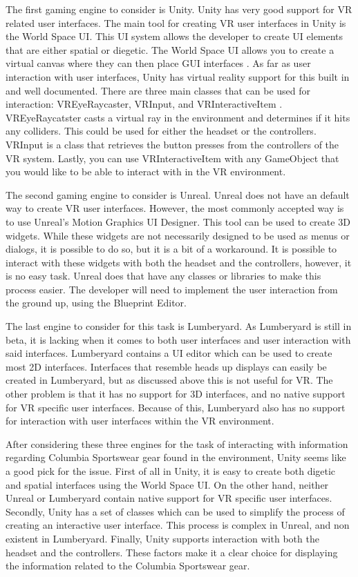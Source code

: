 \documentclass[10pt,journal,compsoc,onecolumn, draftclsnofoot]{IEEEtran}
\begin{document}
\begin{bibunit}
The first gaming engine to consider is Unity.
Unity has very good support for VR related user interfaces.
The main tool for creating VR user interfaces in Unity is the World Space UI.
This UI system allows the developer to create UI elements that are either spatial or diegetic.
The World Space UI allows you to create a virtual canvas where they can then place GUI interfaces \cite{unity_world_space}.
As far as user interaction with user interfaces, Unity has virtual reality support for this built in and well documented.
There are three main classes that can be used for interaction: VREyeRaycaster, VRInput, and VRInteractiveItem \cite{unity_interface_interaction}.
VREyeRaycatster casts a virtual ray in the environment and determines if it hits any colliders.
This could be used for either the headset or the controllers.
VRInput is a class that retrieves the button presses from the controllers of the VR system.
Lastly, you can use VRInteractiveItem with any GameObject that you would like to be able to interact with in the VR environment.

The second gaming engine to consider is Unreal.
Unreal does not have an default way to create VR user interfaces.
However, the most commonly accepted way is to use Unreal's Motion Graphics UI Designer.
This tool can be used to create 3D widgets.
While these widgets are not necessarily designed to be used as menus or dialogs, it is possible to do so, but it is a bit of a workaround.
It is possible to interact with these widgets with both the headset and the controllers, however, it is no easy task.
Unreal does that have any classes or libraries to make this process easier.
The developer will need to implement the user interaction from the ground up, using the Blueprint Editor.

The last engine to consider for this task is Lumberyard.
As Lumberyard is still in beta, it is lacking when it comes to both user interfaces and user interaction with said interfaces.
Lumberyard contains a UI editor which can be used to create most 2D interfaces.
Interfaces that resemble heads up displays can easily be created in Lumberyard, but as discussed above this is not useful for VR.
The other problem is that it has no support for 3D interfaces, and no native support for VR specific user interfaces.
Because of this, Lumberyard also has no support for interaction with user interfaces within the VR environment.

After considering these three engines for the task of interacting with information regarding Columbia Sportswear gear found in the environment, Unity seems like a good pick for the issue.
First of all in Unity, it is easy to create both digetic and spatial interfaces using the World Space UI.
On the other hand, neither Unreal or Lumberyard contain native support for VR specific user interfaces.
Secondly, Unity has a set of classes which can be used to simplify the process of creating an interactive user interface.
This process is complex in Unreal, and non existent in Lumberyard.
Finally, Unity supports interaction with both the headset and the controllers.
These factors make it a clear choice for displaying the information related to the Columbia Sportswear gear.


\end{bibunit}
\end{document}

